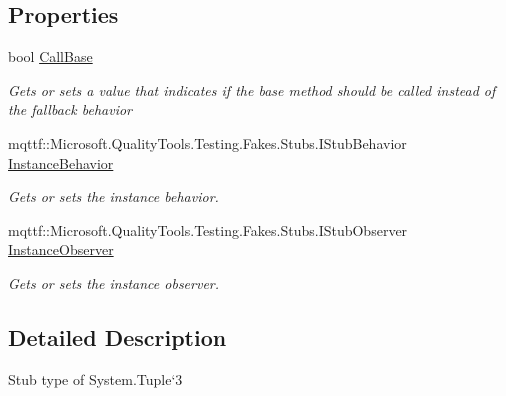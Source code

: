 \subsection*{Properties}
\begin{DoxyCompactItemize}
\item 
bool \hyperlink{class_system_1_1_fakes_1_1_stub_tuple_3_01_t1_00_01_t2_00_01_t3_01_4_ad7cffea3f47302ea4ef7ad9d53069eaf}{Call\-Base}
\begin{DoxyCompactList}\small\item\em Gets or sets a value that indicates if the base method should be called instead of the fallback behavior\end{DoxyCompactList}\item 
mqttf\-::\-Microsoft.\-Quality\-Tools.\-Testing.\-Fakes.\-Stubs.\-I\-Stub\-Behavior \hyperlink{class_system_1_1_fakes_1_1_stub_tuple_3_01_t1_00_01_t2_00_01_t3_01_4_ac9288047e393bf1f5fd425718615ec13}{Instance\-Behavior}
\begin{DoxyCompactList}\small\item\em Gets or sets the instance behavior.\end{DoxyCompactList}\item 
mqttf\-::\-Microsoft.\-Quality\-Tools.\-Testing.\-Fakes.\-Stubs.\-I\-Stub\-Observer \hyperlink{class_system_1_1_fakes_1_1_stub_tuple_3_01_t1_00_01_t2_00_01_t3_01_4_a472be4b9a204c8b49b50ad9d99797bc8}{Instance\-Observer}
\begin{DoxyCompactList}\small\item\em Gets or sets the instance observer.\end{DoxyCompactList}\end{DoxyCompactItemize}


\subsection{Detailed Description}
Stub type of System.\-Tuple`3



